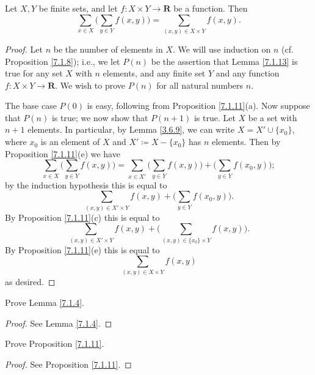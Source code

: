 \begin{lemma}\label{7.1.13}
Let \(X, Y\) be finite sets, and let \(f : X \times Y \to \mathbf{R}\) be a function.
Then
\[
    \sum_{x \in X} \bigg(\sum_{y \in Y} f(x, y)\bigg) = \sum_{(x, y) \in X \times Y} f(x, y).
\]
\end{lemma}

\begin{proof}
Let \(n\) be the number of elements in \(X\).
We will use induction on \(n\) (cf. Proposition \ref{7.1.8});
i.e., we let \(P(n)\) be the assertion that Lemma \ref{7.1.13} is true for any set \(X\) with \(n\) elements, and any finite set \(Y\) and any function \(f : X \times Y \to \mathbf{R}\).
We wish to prove \(P(n)\) for all natural numbers \(n\).

The base case \(P(0)\) is easy, following from Proposition \ref{7.1.11}(a).
Now suppose that \(P(n)\) is true;
we now show that \(P(n + 1)\) is true.
Let \(X\) be a set with \(n + 1\) elements.
In particular, by Lemma \ref{3.6.9}, we can write \(X = X' \cup \{x_0\}\), where \(x_0\) is an element of \(X\) and \(X' \coloneqq X - \{x_0\}\) has \(n\) elements.
Then by Proposition \ref{7.1.11}(e) we have
\[
    \sum_{x \in X} \bigg(\sum_{y \in Y} f(x, y)\bigg) = \sum_{x \in X'} \bigg(\sum_{y \in Y} f(x, y)\bigg) + \bigg(\sum_{y \in Y} f(x_0, y)\bigg);
\]
by the induction hypothesis this is equal to
\[
    \sum_{(x, y) \in X' \times Y} f(x, y) + \bigg(\sum_{y \in Y} f(x_0, y)\bigg).
\]
By Proposition \ref{7.1.11}(c) this is equal to
\[
    \sum_{(x, y) \in X' \times Y} f(x, y) + \bigg(\sum_{(x, y) \in \{x_0\} \times Y} f(x, y)\bigg).
\]
By Proposition \ref{7.1.11}(e) this is equal to
\[
    \sum_{(x, y) \in X \times Y} f(x, y)
\]
as desired.
\end{proof}

\exercisesection

\begin{exercise}\label{ex 7.1.1}
Prove Lemma \ref{7.1.4}.
\end{exercise}

\begin{proof}
See Lemma \ref{7.1.4}.
\end{proof}

\begin{exercise}\label{ex 7.1.2}
Prove Proposition \ref{7.1.11}.
\end{exercise}

\begin{proof}
See Proposition \ref{7.1.11}.
\end{proof}